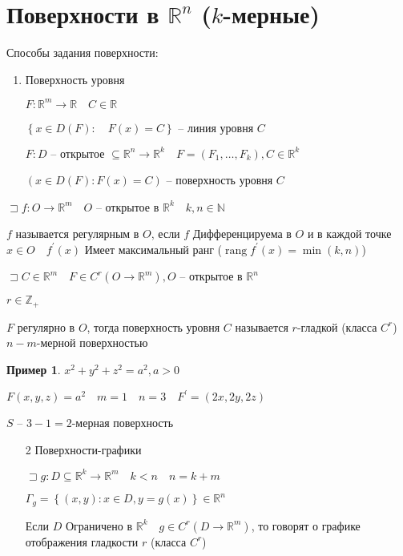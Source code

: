 \documentclass{book}
\newcommand\N{\ensuremath{\mathbb{N}}}
\newcommand\R{\ensuremath{\mathbb{R}}}
\newcommand\Z{\ensuremath{\mathbb{Z}}}
\newcommand{\p}[1]{#1^{\prime}}
\theoremstyle{definition}
\newtheorem*{example}{Пример}
\DeclareMathOperator{\rang}{rang}
\begin{document}
\section{Поверхности в $\R^n$ ($k$-мерные)}

Способы задания поверхности:
\begin{enumerate}
    \item Поверхность уровня

        $F: \R^m \to \R\quad C\in \R$

        $\left\{ x\in D(F):\quad F(x) = C \right\} $ -- линия уровня $C$

        $F:D \text{ -- открытое }\subseteq \R^n \to \R^k\quad F = \left( F_1, \ldots, F_k \right) , C\in \R^k$

        $\left( x\in D(F): F(x) = C \right) $ -- поверхность уровня $C$
\end{enumerate}

\begin{definition}
    $\sqsupset f: O\to \R^m\quad O$ -- открытое в $\R^k\quad k, n\in \N $

    $f$ называется регулярным в  $O$, если  $f$ Дифференцируема в  $O$ и в каждой точке  $x\in O\quad \p f(x)$ Имеет максимальный ранг ($\rang \p f(x) = \min(k,n)$)
\end{definition}

\begin{definition}
    $\sqsupset C\in \R^m\quad F\in C^r(O\to \R^m), O$ -- открытое в $\R^n$

    $r\in \Z _+$

    $F$ регулярно в  $O$, тогда поверхность уровня  $C$ называется $r$-гладкой (класса $C^r$) $n-m$-мерной поверхностью
\end{definition}

\begin{example}
    $x^2+y^2+z^2=a^2, a>0$

    $F(x,y,z) = a^2\quad m = 1\quad n =3\quad \p F = \left( 2x, 2y, 2z \right) $

    $S$ --  $3-1=2$-мерная поверхность
\end{example}

\begin{enumerate}
    \item [2] Поверхности-графики

        $\sqsupset g: D\subseteq \R^k \to \R^m\quad k<n\quad n = k + m$

        $\Gamma_g = \left\{ (x,y) : x\in D, y = g(x) \right\}\in \R^n $

        Если $D$ Ограничено в  $\R^k\quad g\in C^r\left( D \to \R^m \right) $, то говорят о графике отображения гладкости $r$ (класса  $C^r$)
\end{enumerate}
\end{document}
